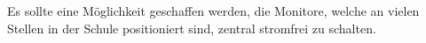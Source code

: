 Es sollte eine Möglichkeit geschaffen werden, die Monitore, welche an vielen Stellen in der Schule positioniert sind, zentral stromfrei zu schalten.